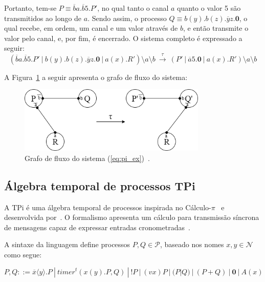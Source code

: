 Portanto, tem-se $P \equiv \overline{b}a.\overline{b}5.P'$, no qual tanto o canal $a$ quanto o valor 5 são transmitidos ao longo de $a$. Sendo assim, o processo $Q \equiv b(y).b(z).\overline{y}z.\textbf{0}$, o qual recebe, em ordem, um canal e um valor através de $b$, e então transmite o valor pelo canal, e, por fim, é encerrado. O sistema completo é expressado a seguir:
\begin{equation} \label{eq:pi_ex}
 (\overline{b}a.\overline{b}5.P'~|~b(y).b(z).\overline{y}z.\textbf{0}~|~a(x).R')\setminus a \setminus b ~ \stackrel{\tau}{\longrightarrow} ~ (P'~|~\overline{a}5.\textbf{0}~|~a(x).R')\setminus a \setminus b
\end{equation}

A Figura~\ref{fig:pi_graph} a seguir apresenta o grafo de fluxo do sistema:

\begin{figure}[ht]
	\centering
	\includegraphics[width=0.8\textwidth]{imagens/calc_pi_ex.png}
	\caption{Grafo de fluxo do sistema (\ref{eq:pi_ex})~\cite{milner1992calculus}.
		\label{fig:pi_graph}}
\end{figure}
\FloatBarrier

\subsection{Álgebra temporal de processos TPi} \label{sec:tpi}
    
A TPi é uma álgebra temporal de processos inspirada no Cálculo-$\pi$~\cite{milner1992calculus, milner1992calculus2} e desenvolvida por~\citeauthor{berger2003two}. O formalismo apresenta um cálculo para transmissão síncrona de mensagens capaz de expressar entradas cronometradas~\cite{aziz2016formal}.

A sintaxe da linguagem define processos $P, Q \in \mathcal{P}$, baseado nos nomes $x, y \in \mathcal{N}$ como segue:

\begin{equation}
P, Q ::= \overline{x}\langle y \rangle.P~|~
timer^{t}(x(y).P,Q)~|~
!P~|~
(vx)P~|~
(P|Q)~|~
(P+Q)~|~
\textbf{0}~|~
A(x)
\end{equation}

